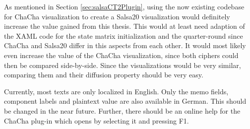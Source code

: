 \begin{description}[style=nextline]
\item[Salsa20 visualization]

As mentioned in Section \ref{sec:salsaCT2Plugin}, using the now existing codebase for ChaCha visualization to create a Salsa20 visualization would definitely increase the value gained from this thesis. This would at least need adaption of the XAML code for the state matrix initialization and the quarter-round since ChaCha and Salsa20 differ in this aspects from each other. It would most likely even increase the value of the ChaCha visualization, since both ciphers could then be compared side-by-side. Since the visualizations would be very similar, comparing them and their diffusion property should be very easy.

\item[Localization and online help]

Currently, most texts are only localized in English. Only the memo fields, component labels and plaintext value are also available in German. This should be changed in the near future. Further, there should be an online help for the ChaCha plug-in which opens by selecting it and pressing F1.

\end{description}

